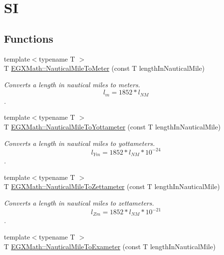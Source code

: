 \hypertarget{group___e_g_x_math-_conversions-_length_conversions-_non-_s_i-_nautical_mile-_s_i}{}\section{SI}
\label{group___e_g_x_math-_conversions-_length_conversions-_non-_s_i-_nautical_mile-_s_i}
\subsection*{Functions}
\begin{DoxyCompactItemize}
\item 
{\footnotesize template$<$typename T $>$ }\\T \mbox{\hyperlink{group___e_g_x_math-_conversions-_length_conversions-_non-_s_i-_nautical_mile-_s_i_ga828e054a1ecb313ed21e6f581110b164}{E\+G\+X\+Math\+::\+Nautical\+Mile\+To\+Meter}} (const T length\+In\+Nautical\+Mile)
\begin{DoxyCompactList}\small\item\em Converts a length in nautical miles to meters. \[ l_{m}=1852 * l_{NM} \]. \end{DoxyCompactList}\item 
{\footnotesize template$<$typename T $>$ }\\T \mbox{\hyperlink{group___e_g_x_math-_conversions-_length_conversions-_non-_s_i-_nautical_mile-_s_i_gaae1116911eff729d693728d7757ac6eb}{E\+G\+X\+Math\+::\+Nautical\+Mile\+To\+Yottameter}} (const T length\+In\+Nautical\+Mile)
\begin{DoxyCompactList}\small\item\em Converts a length in nautical miles to yottameters. \[ l_{Ym}=1852 * l_{NM} * 10^{-24} \]. \end{DoxyCompactList}\item 
{\footnotesize template$<$typename T $>$ }\\T \mbox{\hyperlink{group___e_g_x_math-_conversions-_length_conversions-_non-_s_i-_nautical_mile-_s_i_ga3526b4110d429ac9e322baaa4c088e2b}{E\+G\+X\+Math\+::\+Nautical\+Mile\+To\+Zettameter}} (const T length\+In\+Nautical\+Mile)
\begin{DoxyCompactList}\small\item\em Converts a length in nautical miles to zettameters. \[ l_{Zm}=1852 * l_{NM} * 10^{-21} \]. \end{DoxyCompactList}\item 
{\footnotesize template$<$typename T $>$ }\\T \mbox{\hyperlink{group___e_g_x_math-_conversions-_length_conversions-_non-_s_i-_nautical_mile-_s_i_ga1b24e221d09b49c54d546eb1124e9894}{E\+G\+X\+Math\+::\+Nautical\+Mile\+To\+Exameter}} (const T length\+In\+Nautical\+Mile)

\end{DoxyCompactItemize}
